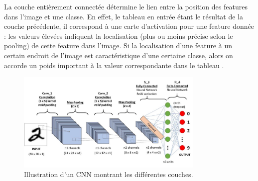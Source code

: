 La couche entièrement connectée détermine le lien entre la position des features dans l'image et une classe. En effet, le tableau en entrée étant le résultat de la couche précédente, il correspond à une carte d'activation pour une feature donnée : les valeurs élevées indiquent la localisation (plus ou moins précise selon le pooling) de cette feature dans l'image. Si la localisation d'une feature à un certain endroit de l'image est caractéristique d'une certaine classe, alors on accorde un poids important à la valeur correspondante dans le tableau \cite{shin2016deep}.

\begin{figure}[H]%
	\centering
	\includegraphics[width=0.8\textwidth]{images/cnn_image1}
	\caption{Illustration d'un CNN montrant les différentes couches.}
	\label{fig:cnn_}
\end{figure}






%









%









%









%
